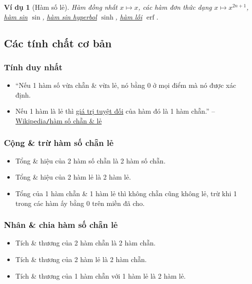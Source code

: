 \documentclass[oneside]{book}
\numberwithin{equation}{section}
\newtheorem{vidu}{Ví dụ}[section]
\begin{document}
\begin{vidu}[Hàm số lẻ]
	Hàm đồng nhất $x\mapsto x$, các hàm đơn thức dạng $x\mapsto x^{2n + 1}$, \href{https://vi.wikipedia.org/wiki/Sin}{hàm sin} $\sin$, \href{https://vi.wikipedia.org/wiki/H%C3%A0m_hyperbolic}{hàm sin hyperbol} $\sinh$, \href{https://vi.wikipedia.org/wiki/H%C3%A0m_l%E1%BB%97i}{hàm lỗi} $\operatorname{erf}$.
\end{vidu}

\subsection{Các tính chất cơ bản}

\subsubsection{Tính duy nhất}
\begin{itemize}
	\item ``Nếu 1 hàm số vừa chẵn \& vừa lẻ, nó bằng $0$ ở mọi điểm mà nó được xác định.
	\item Nếu 1 hàm là lẻ thì \href{https://vi.wikipedia.org/wiki/Gi%C3%A1_tr%E1%BB%8B_tuy%E1%BB%87t_%C4%91%E1%BB%91i}{giá trị tuyệt đối} của hàm đó là 1 hàm chẵn.'' -- \href{https://vi.wikipedia.org/wiki/H%C3%A0m_s%E1%BB%91_ch%E1%BA%B5n_v%C3%A0_l%E1%BA%BB}{Wikipedia\texttt{/}hàm số chẵn \& lẻ}
\end{itemize}

\subsubsection{Cộng \& trừ hàm số chẵn lẻ}
\begin{itemize}
	\item Tổng \& hiệu của 2 hàm số chẵn là 2 hàm số chẵn.
	\item Tổng \& hiệu của 2 hàm lẻ là 2 hàm lẻ.
	\item Tổng của 1 hàm chẵn \& 1 hàm lẻ thì không chẵn cũng không lẻ, trừ khi 1 trong các hàm ấy bằng $0$ trên miền đã cho.
\end{itemize}

\subsubsection{Nhân \& chia hàm số chẵn lẻ}
\begin{itemize}
	\item Tích \& thương của 2 hàm chẵn là 2 hàm chẵn.
	\item Tích \& thương của 2 hàm lẻ là 2 hàm chẵn.
	\item Tích \& thương của 1 hàm chẵn với 1 hàm lẻ là 2 hàm lẻ.
\end{itemize}
\end{document}
